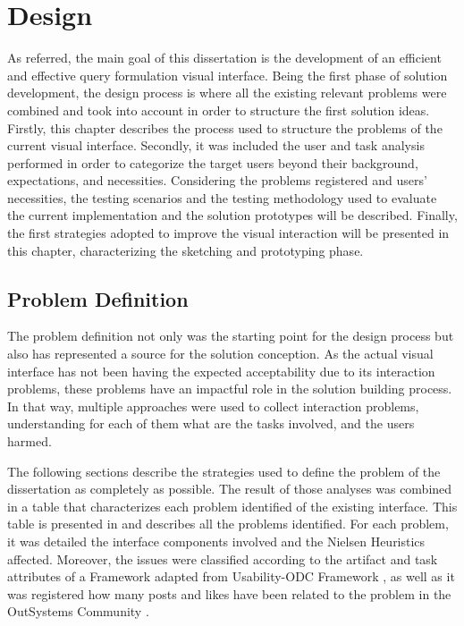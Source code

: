 \chapter{Design}
\label{cha:design}

As referred, the main goal of this dissertation is the development of an efficient and effective query formulation visual interface. Being the first phase of solution development, the design process is where all the existing relevant problems were combined and took into account in order to structure the first solution ideas. Firstly, this chapter describes the process used to structure the problems of the current visual interface. Secondly, it was included the user and task analysis performed in order to categorize the target users beyond their background, expectations, and necessities. Considering the problems registered and users' necessities, the testing scenarios and the testing methodology used to evaluate the current implementation and the solution prototypes will be described. Finally, the first strategies adopted to improve the visual interaction will be presented in this chapter, characterizing the sketching and prototyping phase.

\section{Problem Definition}
\label{sec:problem_definition}

The problem definition not only was the starting point for the design process but also has represented a source for the solution conception. As the actual visual interface has not been having the expected acceptability due to its interaction problems, these problems have an impactful role in the solution building process. In that way, multiple approaches were used to collect interaction problems, understanding for each of them what are the tasks involved, and the users harmed.

The following sections describe the strategies used to define the problem of the dissertation as completely as possible. The result of those analyses was combined in a table that characterizes each problem identified of the existing interface. This table is presented in  and describes all the problems identified. For each problem, it was detailed the interface components involved and the Nielsen Heuristics \cite{nielsen_heuristics} affected. Moreover, the issues were classified according to the artifact and task attributes of a Framework adapted from Usability-ODC Framework \cite{in_process_usability_problem_classification_analysis_improvement}, as well as it was registered how many posts and likes have been related to the problem in the OutSystems Community \cite{outsystems_community}.

